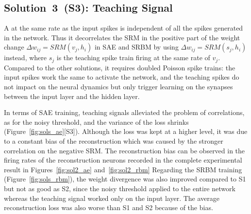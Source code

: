 \subsection{Solution~3~(S3): Teaching Signal}
A \protect{} \protect{} at the same rate as the input spikes \protect{} is \protect{} independent of \protect{} all the spikes generated in the network.
\protect{}
Thus it decorrelates the \protect{} SRM in the positive part of the weight change $\Delta w_{ij} = SRM(v_j,h_i)$ in SAE and SRBM by using $\Delta w_{ij}=SRM(s_j,h_i)$ instead, where $s_j$ is the teaching spike train firing at the same rate of $v_j$.
Compared to the other solutions, it requires doubled Poisson spike trains: the input spikes work the same to activate the network, and the teaching spikes do not impact on the neural dynamics but only trigger learning on the synapses between the input layer and the hidden layer.

In terms of SAE training, teaching signals alleviated the problem of correlations, as for the noisy threshold, and the variance of the loss shrinks (Figure~\ref{fig:sols_ae}[S3]).
Although the loss was kept at a higher level, it was due to a constant bias of the reconstruction which was caused by the stronger correlation on the negative SRM.
The reconstruction bias can be observed in the firing rates of the reconstruction neurons recorded in the complete experimental result in Figures~\ref{fig:sol2_ae} and~\ref{fig:sol2_rbm} \protect{} \protect{}
Regarding the SRBM training (Figure~\ref{fig:sols_rbm}), the weight divergence was also improved compared to S1 but not as good as S2, since the noisy threshold applied to the entire network whereas the teaching signal worked only on the input layer.
The average reconstruction loss was also worse than S1 and S2 because of the bias. 


